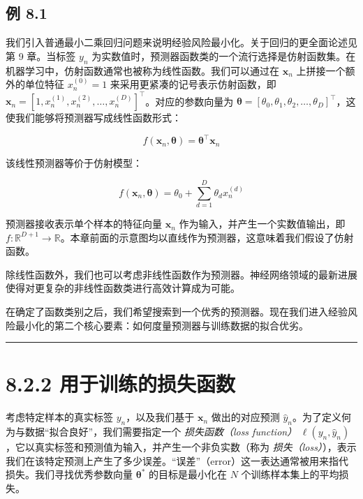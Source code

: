 \subsection*{例 8.1}

我们引入普通最小二乘回归问题来说明经验风险最小化。关于回归的更全面论述见第 9 章。当标签 $ y_n $ 为实数值时，预测器函数类的一个流行选择是仿射函数集。在机器学习中，仿射函数通常也被称为线性函数。我们可以通过在 $ \boldsymbol{x}_n $ 上拼接一个额外的单位特征 $ x_n^{(0)} = 1 $ 来采用更紧凑的记号表示仿射函数，即 $ \boldsymbol{x}_n = [1, x_n^{(1)}, x_n^{(2)}, \ldots, x_n^{(D)}]^\top $。对应的参数向量为 $ \boldsymbol{\theta} = [\theta_0, \theta_1, \theta_2, \ldots, \theta_D]^\top $，这使我们能够将预测器写成线性函数形式：

\begin{equation}
f(\boldsymbol{x}_n, \boldsymbol{\theta}) = \boldsymbol{\theta}^\top \boldsymbol{x}_n
\tag{8.4}\label{eq:8-4}
\end{equation}

该线性预测器等价于仿射模型：

\begin{equation}
f(\boldsymbol{x}_n, \boldsymbol{\theta}) = \theta_0 + \sum_{d=1}^D \theta_d x_n^{(d)}
\tag{8.5}\label{eq:8-5}
\end{equation}

预测器接收表示单个样本的特征向量 $ \boldsymbol{x}_n $ 作为输入，并产生一个实数值输出，即 $ f : \mathbb{R}^{D+1} \to \mathbb{R} $。本章前面的示意图均以直线作为预测器，这意味着我们假设了仿射函数。

除线性函数外，我们也可以考虑非线性函数作为预测器。神经网络领域的最新进展使得对更复杂的非线性函数类进行高效计算成为可能。

在确定了函数类别之后，我们希望搜索到一个优秀的预测器。现在我们进入经验风险最小化的第二个核心要素：如何度量预测器与训练数据的拟合优劣。

\medskip\hrule\medskip

\section*{8.2.2 用于训练的损失函数}

考虑特定样本的真实标签 $ y_n $，以及我们基于 $ \boldsymbol{x}_n $ 做出的对应预测 $ \hat{y}_n $。为了定义何为与数据“拟合良好”，我们需要指定一个 \emph{损失函数（loss function）} $ \ell(y_n, \hat{y}_n) $，它以真实标签和预测值为输入，并产生一个非负实数（称为 \emph{损失（loss）}），表示我们在该特定预测上产生了多少误差。“误差”（error）这一表达通常被用来指代损失。我们寻找优秀参数向量 $ \boldsymbol{\theta}^* $ 的目标是最小化在 $ N $ 个训练样本集上的平均损失。

